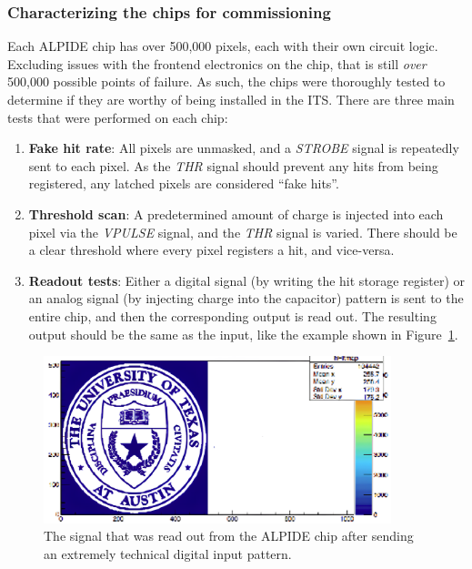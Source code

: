 \subsubsection{Characterizing the chips for commissioning}
\label{sec:hardware_testing}

Each ALPIDE chip has over 500,000 pixels, each with their own circuit logic. Excluding issues with the frontend electronics on the chip, that is still \textit{over} 500,000 possible points of failure. As such, the chips were thoroughly tested to determine if they are worthy of being installed in the ITS. There are three main tests that were performed on each chip:
\begin{enumerate}
    \item \textbf{Fake hit rate}: All pixels are unmasked, and a \textit{STROBE} signal is repeatedly sent to each pixel. As the \textit{THR} signal should prevent any hits from being registered, any latched pixels are considered ``fake hits''.
    \item \textbf{Threshold scan}: A predetermined amount of charge is injected into each pixel via the \textit{VPULSE} signal, and the \textit{THR} signal is varied. There should be a clear threshold where every pixel registers a hit, and vice-versa.
    \item \textbf{Readout tests}: Either a digital signal (by writing the hit storage register) or an analog signal (by injecting charge into the capacitor) pattern is sent to the entire chip, and then the corresponding output is read out. The resulting output should be the same as the input, like the example shown in Figure~\ref{fig:ut_alpide}.
\end{enumerate}

\begin{figure}
    \centering
    \includegraphics[width=0.9\textwidth]{figures/experiment/ut_alpide.png}
    \caption{The signal that was read out from the ALPIDE chip after sending an extremely technical digital input pattern.}
    \label{fig:ut_alpide}
\end{figure}


